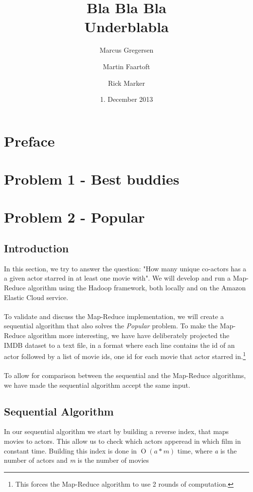 \documentclass[a4paper,11pt]{article}
\newcommand{\BigO}[1]{\ensuremath{\operatorname{O}\left(#1\right)}}
\begin{document}
\date{1. December 2013}
\title{Bla Bla Bla\\Underblabla}
\author{Marcus Gregersen\and Martin Faartoft\and Rick Marker}
\clearpage\maketitle
\thispagestyle{empty}
\setcounter{page}{1}
\section{Preface}
\section{Problem 1 - Best buddies}

\section{Problem 2 - Popular}
\subsection{Introduction}
In this section, we try to answer the question: "How many unique co-actors has a a given actor starred in at least one movie with". We will develop and run a Map-Reduce algorithm using the Hadoop framework, both locally and on the Amazon Elastic Cloud service.
\paragraph{}
To validate and discuss the Map-Reduce implementation, we will create a sequential algorithm that also solves the \emph{Popular} problem. To make the Map-Reduce algorithm more interesting, we have have deliberately projected the IMDB dataset to a text file, in a format where each line contains the id of an actor followed by a list of movie ids, one id for each movie that actor starred in.\footnote{This forces the Map-Reduce algorithm to use 2 rounds of computation.}
\paragraph{} 
To allow for comparison between the sequential and the Map-Reduce algorithms, we have made the sequential algorithm accept the same input.
\subsection{Sequential Algorithm}
\label{sub:sequential}
In our sequential algorithm we start by building a reverse index, that maps movies to actors. This allow us to check which actors apperead in which film in constant time. Building this index is done in \BigO{a*m} time, where \emph{a} is the number of actors and \emph{m} is the number of movies\\
\end{document}
